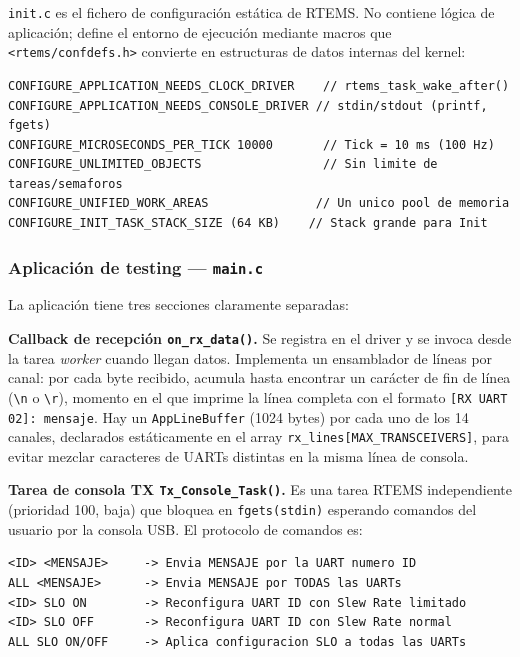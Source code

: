 \texttt{init.c} es el fichero de configuración estática de RTEMS. No contiene lógica de
aplicación; define el entorno de ejecución mediante macros que \texttt{<rtems/confdefs.h>}
convierte en estructuras de datos internas del kernel:

\begin{lstlisting}[caption={Configuración estática de RTEMS en init.c}]
CONFIGURE_APPLICATION_NEEDS_CLOCK_DRIVER    // rtems_task_wake_after()
CONFIGURE_APPLICATION_NEEDS_CONSOLE_DRIVER // stdin/stdout (printf, fgets)
CONFIGURE_MICROSECONDS_PER_TICK 10000       // Tick = 10 ms (100 Hz)
CONFIGURE_UNLIMITED_OBJECTS                 // Sin limite de tareas/semaforos
CONFIGURE_UNIFIED_WORK_AREAS               // Un unico pool de memoria
CONFIGURE_INIT_TASK_STACK_SIZE (64 KB)    // Stack grande para Init
\end{lstlisting}

\subsubsection{Aplicación de testing --- \texttt{main.c}}

La aplicación tiene tres secciones claramente separadas:

\textbf{Callback de recepción \texttt{on\_rx\_data()}.} Se registra en el driver y se invoca desde la
tarea \textit{worker} cuando llegan datos. Implementa un ensamblador de líneas por canal: por cada
byte recibido, acumula hasta encontrar un carácter de fin de línea (\verb|\n| o \verb|\r|),
momento en el que imprime la línea completa con el formato
\texttt{[RX UART 02]: mensaje}. Hay un \texttt{AppLineBuffer} (1024 bytes) por cada uno de los
14 canales, declarados estáticamente en el array \texttt{rx\_lines[MAX\_TRANSCEIVERS]}, para
evitar mezclar caracteres de UARTs distintas en la misma línea de consola.

\textbf{Tarea de consola TX \texttt{Tx\_Console\_Task()}.} Es una tarea RTEMS independiente
(prioridad 100, baja) que bloquea en \texttt{fgets(stdin)} esperando comandos del usuario por
la consola USB. El protocolo de comandos es:

\begin{lstlisting}[caption={Protocolo de comandos de la aplicación de testing}]
<ID> <MENSAJE>     -> Envia MENSAJE por la UART numero ID
ALL <MENSAJE>      -> Envia MENSAJE por TODAS las UARTs
<ID> SLO ON        -> Reconfigura UART ID con Slew Rate limitado
<ID> SLO OFF       -> Reconfigura UART ID con Slew Rate normal
ALL SLO ON/OFF     -> Aplica configuracion SLO a todas las UARTs
\end{lstlisting}

